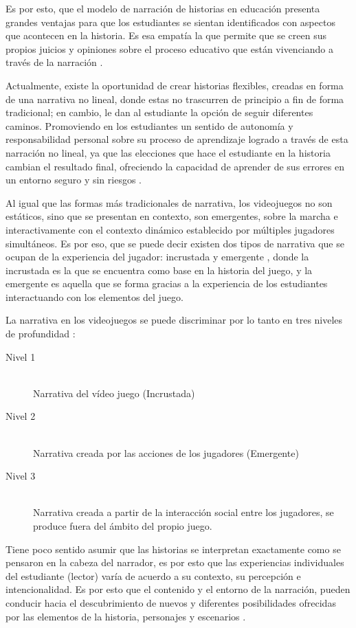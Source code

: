 Es por esto, que el modelo de narración de historias en educación presenta grandes ventajas para que los 
estudiantes se sientan identificados con aspectos que acontecen en la historia. Es esa empatía la que permite 
que se creen sus propios juicios y opiniones sobre el proceso educativo que están vivenciando a través de la
narración \cite{tornero2016ideas}.

Actualmente, existe la oportunidad de crear historias flexibles, creadas en forma de una narrativa no lineal, 
donde estas no trascurren de principio a fin de forma tradicional; en cambio, le dan al estudiante la opción
de seguir diferentes caminos. Promoviendo en los estudiantes un sentido de autonomía y responsabilidad 
personal sobre su proceso de aprendizaje logrado a través de esta narración no lineal, ya que las elecciones
que hace el estudiante en la historia cambian el resultado final, ofreciendo la capacidad de aprender de sus
errores en un entorno seguro y sin riesgos \cite{trevor2017}.

Al igual que las formas más tradicionales de narrativa, los videojuegos no son estáticos, sino que se
presentan en contexto, son emergentes, sobre la marcha e interactivamente con el contexto dinámico establecido
por múltiples jugadores simultáneos. \cite{Young2015199} Es por eso, que se puede decir existen dos tipos de
narrativa que se ocupan de la experiencia del jugador: incrustada y emergente \cite{SBIE8805}, donde la
incrustada es la que se encuentra como base en la historia del juego, y la emergente es aquella que se forma
gracias a la experiencia de los estudiantes interactuando con los elementos del juego.

La narrativa en los videojuegos se puede discriminar por lo tanto en tres niveles de profundidad
\cite{Young2015199}:

\begin{description}
\item[Nivel 1] \hfill \\ Narrativa del vídeo juego (Incrustada)
\item[Nivel 2] \hfill \\ Narrativa creada por las acciones de los jugadores (Emergente)
\item[Nivel 3] \hfill \\ Narrativa creada a partir de la interacción social entre los jugadores, se produce
fuera del ámbito del propio juego.
\end{description}

Tiene poco sentido asumir que las historias se interpretan exactamente como se pensaron en la cabeza del 
narrador, es por esto que las experiencias individuales del estudiante (lector) varía de acuerdo a su
contexto, su percepción e intencionalidad. Es por esto que el contenido y el entorno de la narración, pueden
conducir hacia el descubrimiento de nuevos y diferentes posibilidades ofrecidas por las elementos de la
historia, personajes y escenarios \cite{Young2015199}.

